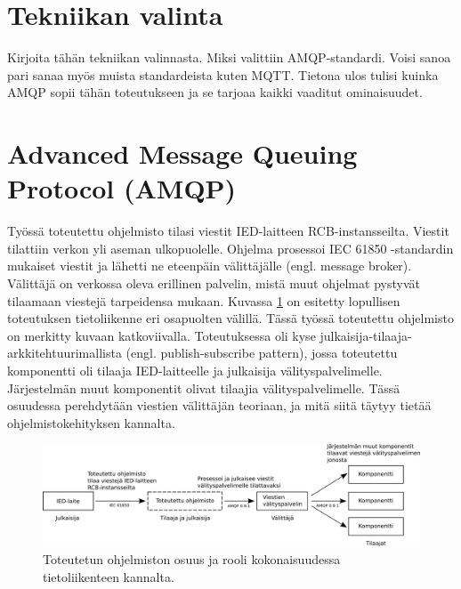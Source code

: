 \section{Tekniikan valinta}
\begin{it}
	Kirjoita tähän tekniikan valinnasta. Miksi valittiin AMQP-standardi. Voisi sanoa pari sanaa myös muista standardeista kuten MQTT. Tietona ulos tulisi kuinka AMQP sopii tähän toteutukseen ja se tarjoaa kaikki vaaditut ominaisuudet.
\end{it}


\section{Advanced Message Queuing Protocol (AMQP)}
\label{ch:amqp-theory}
Työssä toteutettu ohjelmisto tilasi viestit IED-laitteen RCB-instansseilta. Viestit tilattiin verkon yli aseman ulkopuolelle. Ohjelma prosessoi IEC 61850 -standardin mukaiset viestit ja lähetti ne eteenpäin välittäjälle (engl. message broker). Välittäjä on verkossa oleva erillinen palvelin, mistä muut ohjelmat pystyvät tilaamaan viestejä tarpeidensa mukaan. Kuvassa \ref{fig:implemented-system-communication} on esitetty lopullisen toteutuksen tietoliikenne eri osapuolten välillä. Tässä työssä toteutettu ohjelmisto on merkitty kuvaan katkoviivalla. Toteutuksessa oli kyse julkaisija-tilaaja-arkkitehtuurimallista (engl. publish-subscribe pattern), jossa toteutettu komponentti oli tilaaja IED-laitteelle ja julkaisija välityspalvelimelle. Järjestelmän muut komponentit olivat tilaajia välityspalvelimelle. Tässä osuudessa perehdytään viestien välittäjän teoriaan, ja mitä siitä täytyy tietää ohjelmistokehityksen kannalta.

\begin{figure}[ht!]
	\includegraphics[width=1\textwidth]{pictures/implemented-system-communication.png}
	\caption{Toteutetun ohjelmiston osuus ja rooli kokonaisuudessa tietoliikenteen kannalta.}
	\label{fig:implemented-system-communication}
\end{figure}

